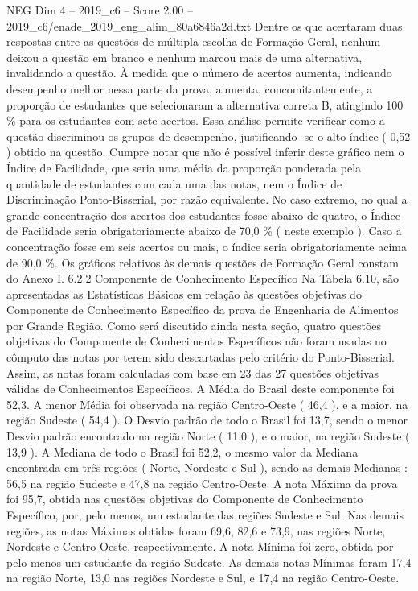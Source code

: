 \begin{textsample}{NEG Dim 4 – 2019\_c6 – Score 2.00 – 2019\_c6/enade\_2019\_eng\_alim\_80a6846a2d.txt}
Dentre os que acertaram duas respostas entre as questões de múltipla escolha de Formação Geral, nenhum deixou a questão em branco e nenhum marcou mais de uma alternativa, invalidando a questão.
À medida que o número de acertos aumenta, indicando desempenho melhor nessa parte da prova, aumenta, concomitantemente, a proporção de estudantes que selecionaram a alternativa correta B, atingindo 100 \% para os estudantes com sete acertos.
Essa análise permite verificar como a questão discriminou os grupos de desempenho, justificando -se o alto índice ( 0,52 ) obtido na questão.
Cumpre notar que não é possível inferir deste gráfico nem o Índice de Facilidade, que seria uma média da proporção ponderada pela quantidade de estudantes com cada uma das notas, nem o Índice de Discriminação Ponto-Bisserial, por razão equivalente.
No caso extremo, no qual a grande concentração dos acertos dos estudantes fosse abaixo de quatro, o Índice de Facilidade seria obrigatoriamente abaixo de 70,0 \% ( neste exemplo ).
Caso a concentração fosse em seis acertos ou mais, o índice seria obrigatoriamente acima de 90,0 \%.
Os gráficos relativos às demais questões de Formação Geral constam do Anexo I. 6.2.2 Componente de Conhecimento Específico Na Tabela 6.10, são apresentadas as Estatísticas Básicas em relação às questões objetivas do Componente de Conhecimento Específico da prova de Engenharia de Alimentos por Grande Região.
Como será discutido ainda nesta seção, quatro questões objetivas do Componente de Conhecimentos Específicos não foram usadas no cômputo das notas por terem sido descartadas pelo critério do Ponto-Bisserial.
Assim, as notas foram calculadas com base em 23 das 27 questões objetivas válidas de Conhecimentos Específicos.
A Média do Brasil deste componente foi 52,3.
A menor Média foi observada na região Centro-Oeste ( 46,4 ), e a maior, na região Sudeste ( 54,4 ).
O Desvio padrão de todo o Brasil foi 13,7, sendo o menor Desvio padrão encontrado na região Norte ( 11,0 ), e o maior, na região Sudeste ( 13,9 ).
A Mediana de todo o Brasil foi 52,2, o mesmo valor da Mediana encontrada em três regiões ( Norte, Nordeste e Sul ), sendo as demais Medianas : 56,5 na região Sudeste e 47,8 na região Centro-Oeste.
A nota Máxima da prova foi 95,7, obtida nas questões objetivas do Componente de Conhecimento Específico, por, pelo menos, um estudante das regiões Sudeste e Sul.
Nas demais regiões, as notas Máximas obtidas foram 69,6, 82,6 e 73,9, nas regiões Norte, Nordeste e Centro-Oeste, respectivamente.
A nota Mínima foi zero, obtida por pelo menos um estudante da região Sudeste.
As demais notas Mínimas foram 17,4 na região Norte, 13,0 nas regiões Nordeste e Sul, e 17,4 na região Centro-Oeste.

\end{textsample}
